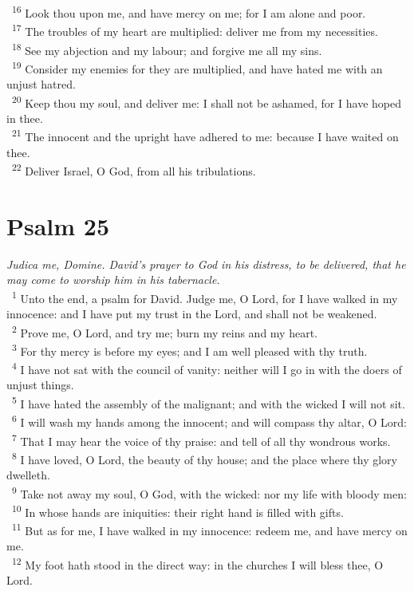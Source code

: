 \documentclass[a5paper,12pt]{article}
\begin{document}
\begin{multicols*}{2}
~\textsuperscript{16} Look thou upon me, and have mercy on me; for I am alone and poor.\\
~\textsuperscript{17} The troubles of my heart are multiplied: deliver me from my necessities.\\
~\textsuperscript{18} See my abjection and my labour; and forgive me all my sins.\\
~\textsuperscript{19} Consider my enemies for they are multiplied, and have hated me with an unjust hatred.\\
~\textsuperscript{20} Keep thou my soul, and deliver me: I shall not be ashamed, for I have hoped in thee.\\
~\textsuperscript{21} The innocent and the upright have adhered to me: because I have waited on thee.\\
~\textsuperscript{22} Deliver Israel, O God, from all his tribulations.\\

\section{Psalm 25}
\label{sec:org02998f4}
\emph{Judica me, Domine. David's prayer to God in his distress, to be delivered, that he may come to worship him in his tabernacle.}\\

~\textsuperscript{1} Unto the end, a psalm for David. Judge me, O Lord, for I have walked in my innocence: and I have put my trust in the Lord, and shall not be weakened.\\
~\textsuperscript{2} Prove me, O Lord, and try me; burn my reins and my heart.\\
~\textsuperscript{3} For thy mercy is before my eyes; and I am well pleased with thy truth.\\
~\textsuperscript{4} I have not sat with the council of vanity: neither will I go in with the doers of unjust things.\\
~\textsuperscript{5} I have hated the assembly of the malignant; and with the wicked I will not sit.\\
~\textsuperscript{6} I will wash my hands among the innocent; and will compass thy altar, O Lord:\\
~\textsuperscript{7} That I may hear the voice of thy praise: and tell of all thy wondrous works.\\
~\textsuperscript{8} I have loved, O Lord, the beauty of thy house; and the place where thy glory dwelleth.\\
~\textsuperscript{9} Take not away my soul, O God, with the wicked: nor my life with bloody men:\\
~\textsuperscript{10} In whose hands are iniquities: their right hand is filled with gifts.\\
~\textsuperscript{11} But as for me, I have walked in my innocence: redeem me, and have mercy on me.\\
~\textsuperscript{12} My foot hath stood in the direct way: in the churches I will bless thee, O Lord.\\


\end{multicols*}
\end{document}
